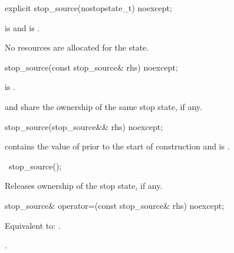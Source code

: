 %
\begin{itemdecl}
explicit stop_source(nostopstate_t) noexcept;
\end{itemdecl}

\begin{itemdescr}
\pnum
\ensures
{} is  and
 is .
\begin{note}
No resources are allocated for the state.
\end{note}
\end{itemdescr}

%
\begin{itemdecl}
stop_source(const stop_source& rhs) noexcept;
\end{itemdecl}

\begin{itemdescr}
\pnum
\ensures
{} is .
\begin{note}
 and  share the ownership of the same stop state,
if any.
\end{note}
\end{itemdescr}

%
\begin{itemdecl}
stop_source(stop_source&& rhs) noexcept;
\end{itemdecl}

\begin{itemdescr}
\pnum
\ensures
{} contains the value of 
prior to the start of construction
and  is .
\end{itemdescr}

%
\begin{itemdecl}
~stop_source();
\end{itemdecl}

\begin{itemdescr}
\pnum
\effects
Releases ownership of the stop state, if any.
\end{itemdescr}

%
\begin{itemdecl}
stop_source& operator=(const stop_source& rhs) noexcept;
\end{itemdecl}

\begin{itemdescr}
\pnum
\effects
Equivalent to: .

\pnum
\returns
{}.
\end{itemdescr}

